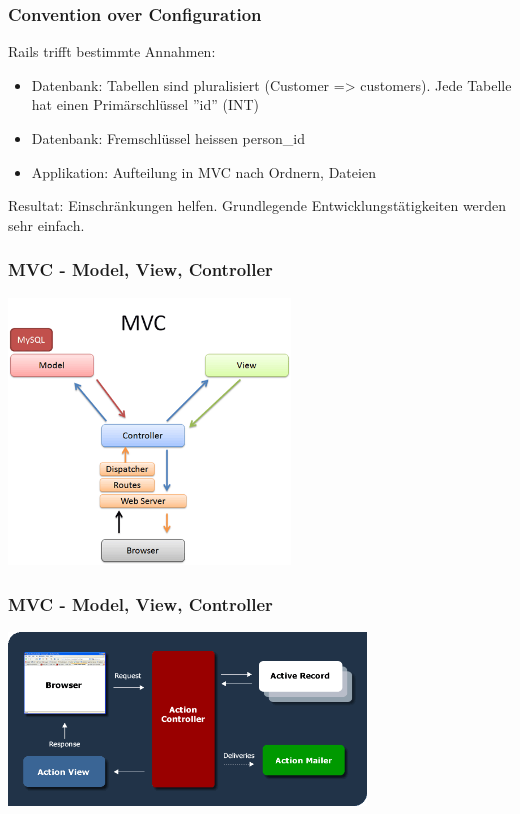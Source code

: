 \begin{frame}
  \frametitle{Convention over Configuration}
  Rails trifft bestimmte Annahmen:
  \vspace{0.5cm}
  \begin{itemize}
    \pause
    \item Datenbank: Tabellen sind pluralisiert (Customer => customers). Jede Tabelle hat einen Primärschlüssel ''id'' (INT)
    \pause
    \item Datenbank: Fremschlüssel heissen person\_id
    \pause
    \item Applikation: Aufteilung in MVC nach Ordnern, Dateien
  \end{itemize}
  \vspace{0.5cm}
  Resultat: Einschränkungen helfen. Grundlegende Entwicklungstätigkeiten werden sehr einfach.
\end{frame}

\begin{frame}
  \frametitle{MVC - Model, View, Controller}
  \begin{center}
    \includegraphics[width=7.5cm]{img/mvc.png}
  \end{center}
\end{frame}

\begin{frame}
  \frametitle{MVC - Model, View, Controller}
  \begin{center}
    \includegraphics[width=9.5cm]{img/mvc_rails.png}
  \end{center}
\end{frame}

